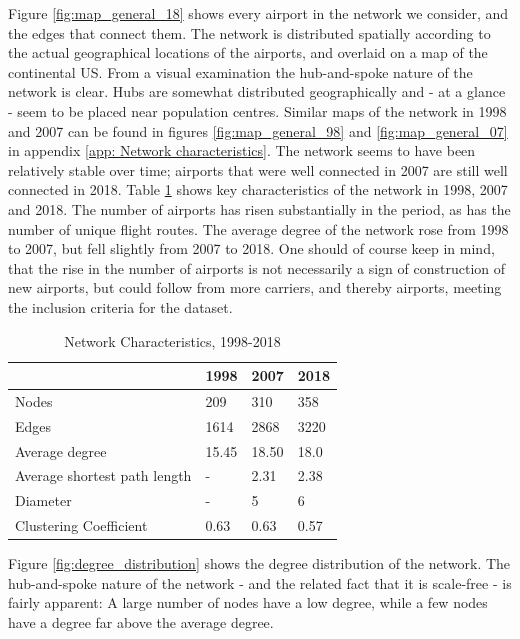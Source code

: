 Figure \ref{fig:map_general_18} shows every airport in the network we consider, and the edges that connect them. The network is distributed spatially according to the actual geographical locations of the airports, and overlaid on a map of the continental US. From a visual examination the hub-and-spoke nature of the network is clear. Hubs are somewhat distributed geographically and - at a glance - seem to be placed near population centres. Similar maps of the network in 1998 and 2007 can be found in figures \ref{fig:map_general_98} and \ref{fig:map_general_07} in appendix \ref{app: Network characteristics}. The network seems to have been relatively stable over time; airports that were well connected in 2007 are still well connected in 2018. Table \ref{tab: temporal} shows key characteristics of the network in 1998, 2007 and 2018. The number of airports has risen substantially in the period, as has the number of unique flight routes. The average degree of the network rose from 1998 to 2007, but fell slightly from 2007 to 2018. One should of course keep in mind, that the rise in the number of airports is not necessarily a sign of construction of new airports, but could follow from more carriers, and thereby airports, meeting the inclusion criteria for the dataset.
\begin{table}[H]
\centering 
\caption{Network Characteristics, 1998-2018}
\label{tab: temporal}
\begin{tabular}{|l|l|l|l|}
\hline
\textbf{}                    & \textbf{1998} & \textbf{2007} & \textbf{2018} \\ \hline
Nodes                        & 209           & 310           & 358           \\
Edges                        & 1614          & 2868          & 3220          \\
Average degree               & 15.45         & 18.50         & 18.0          \\
Average shortest path length & -             & 2.31          & 2.38          \\ 
Diameter                     & -             & 5             & 6 
     \\
Clustering Coefficient       & 0.63          & 0.63          & 0.57          \\ \hline
\end{tabular}
\end{table}
Figure \ref{fig:degree_distribution} shows the degree distribution of the network. The hub-and-spoke nature of the network - and the related fact that it is scale-free - is fairly apparent: A large number of nodes have a low degree, while a few nodes have a degree far above the average degree. 
